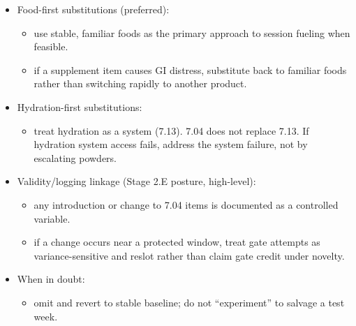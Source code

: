\documentclass[10pt]{article}
\begin{document}
\begin{itemize}
\item Food-first substitutions (preferred):
  \begin{itemize}
  \item use stable, familiar foods as the primary approach to session fueling when feasible.
  \item if a supplement item causes GI distress, substitute back to familiar foods rather than switching rapidly to another product.
  \end{itemize}
\item Hydration-first substitutions:
  \begin{itemize}
  \item treat hydration as a system (7.13). 7.04 does not replace 7.13. If hydration system access fails, address the system failure, not by escalating powders.
  \end{itemize}
\item Validity/logging linkage (Stage 2.E posture, high-level):
  \begin{itemize}
  \item any introduction or change to 7.04 items is documented as a controlled variable.
  \item if a change occurs near a protected window, treat gate attempts as variance-sensitive and reslot rather than claim gate credit under novelty.
  \end{itemize}
\item When in doubt:
  \begin{itemize}
  \item omit and revert to stable baseline; do not “experiment” to salvage a test week.
  \end{itemize}
\end{itemize}
\end{document}
